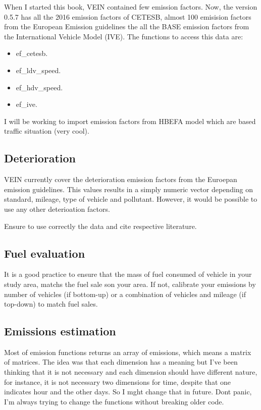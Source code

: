 \documentclass[12pt,graybox,envcountchap,sectrefs]{krantz}
\providecommand{\tightlist}{%
  \setlength{\itemsep}{0pt}\setlength{\parskip}{0pt}}
\theoremstyle{definition}
\theoremstyle{definition}
\theoremstyle{definition}
\theoremstyle{remark}
\begin{document}
When I started this book, VEIN contained few emission factors. Now, the
version 0.5.7 has all the 2016 emission factors of CETESB, almost 100
emisision factors from the European Emission guidelines the all the BASE
emission factors from the International Vehicle Model (IVE). The
functions to access this data are:

\begin{itemize}
\tightlist
\item
  ef\_cetesb.
\item
  ef\_ldv\_speed.
\item
  ef\_hdv\_speed.
\item
  ef\_ive.
\end{itemize}

I will be working to import emission factors from HBEFA model which are
based traffic situation (very cool).

\subsection{Deterioration}\label{deterioration}

VEIN currently cover the deterioration emission factors from the
Euroepan emission guidelines. This values results in a simply numeric
vector depending on standard, mileage, type of vehicle and pollutant.
However, it would be possible to use any other deterioation factors.

Ensure to use correctly the data and cite respective literature.

\subsection{Fuel evaluation}\label{fuel-evaluation}

It is a good practice to ensure that the mass of fuel consumed of
vehicle in your study area, matchs the fuel sale son your area. If not,
calibrate your emissions by number of vehicles (if bottom-up) or a
combination of vehicles and mileage (if top-down) to match fuel sales.

\subsection{Emissions estimation}\label{emissions-estimation}

Most of emission functions returns an array of emissions, which means a
matrix of matrices. The idea was that each dimension has a meaning but
I've been thinking that it is not necessary and each dimension should
have different nature, for instance, it is not necessary two dimensions
for time, despite that one indicates hour and the other days. So I mght
change that in future. Dont panic, I'm always trying to change the
functions without breaking older code.
\end{document}
